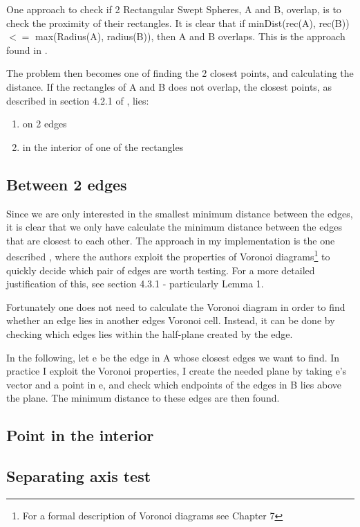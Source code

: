 One approach to check if 2 Rectangular Swept Spheres, A and B, overlap, is to check the proximity of their rectangles. It is clear that if minDist(rec(A), rec(B)) $<=$ max(Radius(A), radius(B)), then A and B overlaps. This is the approach found in \cite{Larsen99fastproximity}.

The problem then becomes one of finding the 2 closest points, and calculating the distance.
If the rectangles of A and B does not overlap, the closest points, as described in section 4.2.1 of \cite{Larsen9fastproximity}, lies:
\begin{enumerate}
\item on 2 edges
\item in the interior of one of the rectangles
\end{enumerate}

\subsection{Between 2 edges}
Since we are only interested in the smallest minimum distance between the edges, it is clear that we only have calculate the minimum distance between the edges that are closest to each other. The approach in my implementation is the one described \cite{Larsen99fastproximity}, where the authors exploit the properties of Voronoi diagrams\footnote{For a formal description of Voronoi diagrams see \cite{compgeom:2008} Chapter 7} to quickly decide which pair of edges are worth testing. For a more detailed justification of this, see \cite{Larsen99fastproximity} section 4.3.1 - particularly Lemma 1.  

Fortunately one does not need to calculate the Voronoi diagram in order to find whether an edge lies in another edges Voronoi cell. Instead, it can be done by checking which edges lies within the half-plane created by the edge.

In the following, let e be the edge in A whose closest edges we want to find.  
In practice I exploit the Voronoi properties, I create the needed plane by taking e's vector and a point in e, and check which endpoints of the edges in B lies above the plane. The minimum distance to these edges are then found.

\subsection{Point in the interior}


\subsection{Separating axis test}
\label{sepAxis}

